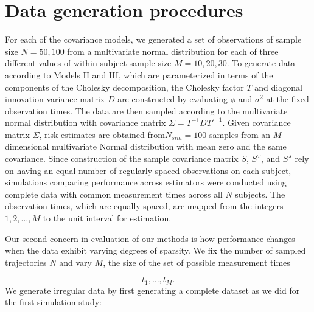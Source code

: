 \section{Data generation procedures}

For each of the covariance models, we generated a set of observations of sample size $N = 50, 100$ from a multivariate normal distribution for each of three different values of within-subject sample size $M = 10, 20, 30$. To generate data according to Models II and III, which are parameterized in terms of the components of the Cholesky decomposition, the Cholesky factor $T$ and diagonal innovation variance matrix $D$ are constructed by evaluating $\phi$ and $\sigma^2$ at the fixed observation times. The data are then sampled according to the multivariate normal distribution with covariance matrix $\Sigma = T^{-1} D {T'}^{-1}$. Given covariance matrix $\Sigma$, risk estimates are obtained from$N_{sim} = 100$ samples from an $M$-dimensional multivariate Normal distribution with mean zero and the same covariance.  Since construction of the sample covariance matrix $S$, $S^\omega$, and $S^\lambda$ rely on having an equal number of regularly-spaced observations on each subject, simulations comparing performance across estimators were conducted using complete data with common measurement times across all $N$ subjects. The observation times, which are equally spaced, are mapped from the integers $1,2, \dots, M$ to the unit interval for estimation.

\bigskip

Our second concern in evaluation of our methods is how performance changes when the data exhibit varying degrees of sparsity. We fix the number of sampled trajectories $N$ and vary $M$, the size of the set  of possible measurement times

\[
t_1,\dots, t_M.
\]
\noindent
We generate irregular data by first generating a complete dataset as we did for the first simulation study:

